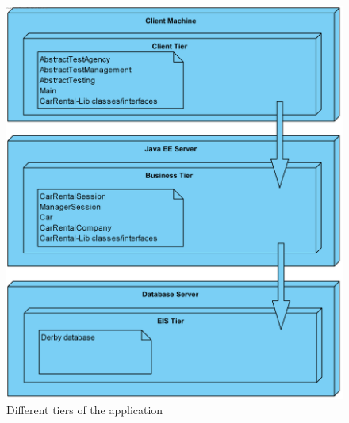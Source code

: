 \documentclass{ds-report}
\begin{document}
	
\begin{figure}
  \includegraphics[width=\linewidth]{tier_diagram.png}
  \caption{Different tiers of the application}
  \label{fig:tier_diagram}
\end{figure}	
	
	\clearpage


	
\end{document}
